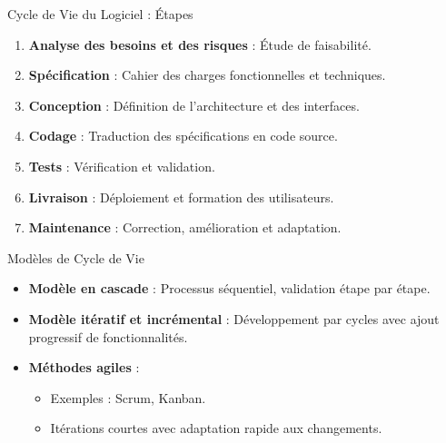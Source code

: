 \documentclass{beamer}
\begin{document}
\begin{frame}{Cycle de Vie du Logiciel : Étapes}
    \begin{enumerate}
        \item \textbf{Analyse des besoins et des risques} : Étude de faisabilité.
        \item \textbf{Spécification} : Cahier des charges fonctionnelles et techniques.
        \item \textbf{Conception} : Définition de l'architecture et des interfaces.
        \item \textbf{Codage} : Traduction des spécifications en code source.
        \item \textbf{Tests} : Vérification et validation.
        \item \textbf{Livraison} : Déploiement et formation des utilisateurs.
        \item \textbf{Maintenance} : Correction, amélioration et adaptation.
    \end{enumerate}
\end{frame}

\begin{frame}{Modèles de Cycle de Vie}
    \begin{itemize}
        \item \textbf{Modèle en cascade} : Processus séquentiel, validation étape par étape.
        \item \textbf{Modèle itératif et incrémental} : Développement par cycles avec ajout progressif de fonctionnalités.
        \item \textbf{Méthodes agiles} :
        \begin{itemize}
            \item Exemples : Scrum, Kanban.
            \item Itérations courtes avec adaptation rapide aux changements.
        \end{itemize}
    \end{itemize}
\end{frame}
\end{document}

